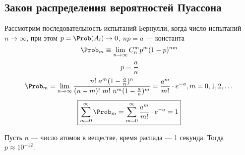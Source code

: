 \subsection{Закон распределения вероятностей Пуассона}
Рассмотрим последовательность испытаний Бернулли, когда число испытаний $n \to \infty$, при этом $p = \Prob(A_i) \to 0$, $np = a$ --- константа
\[
	\Prob_m \equiv \lim_{n \to \infty} C_n^m p^m (1-p)^{nm}
\]
\[ p = \frac{a}{n} \]
\[ \Prob_m = \lim_{n \to \infty} \frac{n!\ a^m (1 - \frac{a}{n})^n}{(n-m)!\ m!\ n^m (1 - \frac{a}{n})^m} = \frac{a^m}{m!} \cdot e^{-a}, m = 0, 1, 2, \dots \]
\[ \boxed{\sum\limits_{m=0}^\infty \Prob_m = \sum\limits_{m=0}^\infty \frac{a^m}{m!} \cdot e^{-a} = 1}\]
\begin{example}
	Пусть $n$ --- число атомов в веществе, время распада --- 1 секунда. Тогда $p \approx 10^{-12}$.
\end{example}


